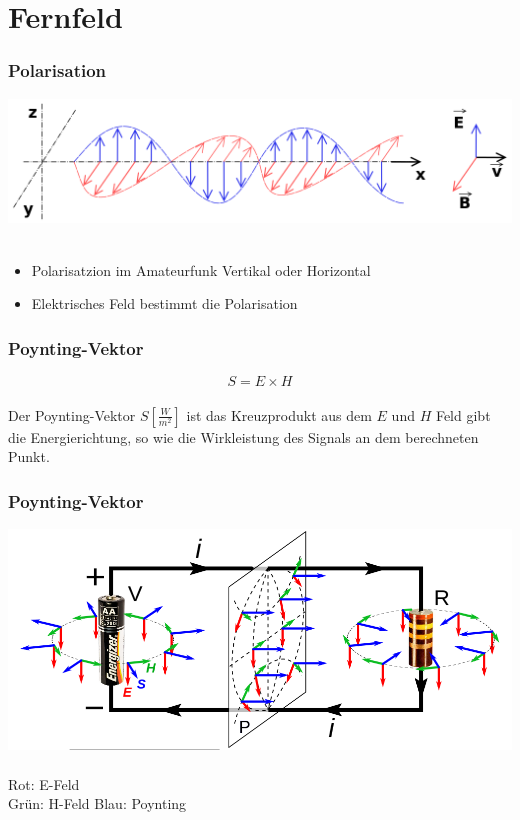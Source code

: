 \section*{Fernfeld}

\begin{frame}
    \frametitle{Polarisation}
    \begin{center}
		\includegraphics[width=1\textwidth]{a08/Onde_electromagnetique.png}\\
		\tiny \hyperlink{refs}{\cite{wm}} \\[1em] \large
		\begin{itemize}
			\item Polarisatzion im Amateurfunk Vertikal oder Horizontal
			\item Elektrisches Feld bestimmt die Polarisation
		\end{itemize}
	\end{center}
\end{frame}

\begin{frame}
    \frametitle{Poynting-Vektor}
    \begin{center}
		\huge $$S = E \times H$$ \\[1em]
		\large Der Poynting-Vektor $S[\frac{W}{m^2}]$ ist das Kreuzprodukt aus dem $E$ und $H$ Feld gibt die Energierichtung, so wie die Wirkleistung des Signals an dem berechneten Punkt.
	\end{center}
\end{frame}

\begin{frame}
    \frametitle{Poynting-Vektor}
    \begin{center}
		\includegraphics[width=1\textwidth]{a08/Poynting_vectors_of_DC_circuit.png}\\
		\tiny \hyperlink{refs}{\cite{wm}} \\[1em] \large
		Rot: E-Feld \\
		Grün: H-Feld
		Blau: Poynting
	\end{center}
\end{frame}

